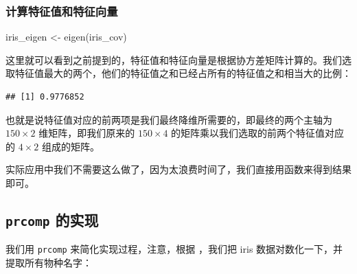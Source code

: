 \documentclass[
]{krantz}
\makeatletter
\newenvironment{Shaded}{\begin{snugshade}}{\end{snugshade}}
\newcommand{\DecValTok}[1]{\textcolor[rgb]{0.00,0.00,0.81}{#1}}
\newcommand{\FunctionTok}[1]{\textcolor[rgb]{0.00,0.00,0.00}{#1}}
\newcommand{\NormalTok}[1]{#1}
\newcommand{\OtherTok}[1]{\textcolor[rgb]{0.56,0.35,0.01}{#1}}
\newcommand{\SpecialCharTok}[1]{\textcolor[rgb]{0.00,0.00,0.00}{#1}}
\newcommand{\StringTok}[1]{\textcolor[rgb]{0.31,0.60,0.02}{#1}}
\newenvironment{kframe}{%
\medskip{}
\setlength{\fboxsep}{.8em}
 \def\at@end@of@kframe{}%
 \ifinner\ifhmode%
  \def\at@end@of@kframe{\end{minipage}}%
  \begin{minipage}{\columnwidth}%
 \fi\fi%
 \def\FrameCommand##1{\hskip\@totalleftmargin \hskip-\fboxsep
 \colorbox{shadecolor}{##1}\hskip-\fboxsep
     \hskip-\linewidth \hskip-\@totalleftmargin \hskip\columnwidth}%
 \MakeFramed {\advance\hsize-\width
   \@totalleftmargin\z@ \linewidth\hsize
   \@setminipage}}%
 {\par\unskip\endMakeFramed%
 \at@end@of@kframe}
\renewenvironment{Shaded}{\begin{kframe}}{\end{kframe}}
\makeatother
\begin{document}
\hypertarget{eig_val}{%
\subsubsection{计算特征值和特征向量}\label{eig_val}}

\begin{Shaded}
\begin{Highlighting}[]
\NormalTok{iris\_eigen }\OtherTok{\textless{}{-}} \FunctionTok{eigen}\NormalTok{(iris\_cov)}
\end{Highlighting}
\end{Shaded}

这里就可以看到之前提到的，特征值和特征向量是根据协方差矩阵计算的。我们选取特征值最大的两个，他们的特征值之和已经占所有的特征值之和相当大的比例：

\begin{Shaded}
\end{Shaded}

\begin{verbatim}
## [1] 0.9776852
\end{verbatim}

也就是说特征值对应的前两项是我们最终降维所需要的，即最终的两个主轴为 \(150 \times 2\) 维矩阵，即我们原来的 \(150 \times 4\) 的矩阵乘以我们选取的前两个特征值对应的 \(4 \times 2\) 组成的矩阵。

实际应用中我们不需要这么做了，因为太浪费时间了，我们直接用函数来得到结果即可。

\hypertarget{prcom}{%
\subsection{\texorpdfstring{\texttt{prcomp} 的实现}{prcomp 的实现}}\label{prcom}}

我们用 \texttt{prcomp} 来简化实现过程，注意，根据 \citet{kemp2003modern}，我们把 iris 数据对数化一下，并提取所有物种名字：

\begin{Shaded}
\end{Shaded}
\end{document}
